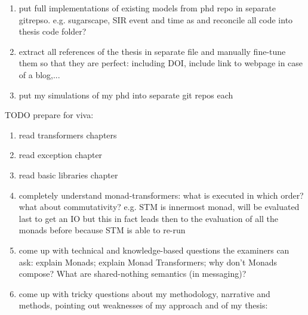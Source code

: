 \documentclass[oneside]{book}
\begin{document}
\begin{enumerate}
	\item put full implementations of existing models from phd repo in separate gitrepso. e.g. sugarscape, SIR event and time as and reconcile all code into thesis code folder?
	
	\item extract all references of the thesis in separate file and manually fine-tune them so that they are perfect: including DOI, include link to webpage in case of a blog,...
	
	\item put my simulations of my phd into separate git repos each
\end{enumerate}

TODO prepare for viva:
\begin{enumerate}
	\item read transformers chapters
	
	\item read exception chapter

	\item read basic libraries chapter	
	
	\item completely understand monad-transformers: what is executed in which order? what about commutativity? e.g. STM is innermost monad, will be evaluated last to get an IO but this in fact leads then to the evaluation of all the monads before because STM is able to re-run
	
	\item come up with technical and knowledge-based questions the examiners can ask: explain Monads; explain Monad Transformers; why don't Monads compose? What are shared-nothing semantics (in messaging)? 
	
	\item come up with tricky questions about my methodology, narrative and methods, pointing out weaknesses of my approach and of my thesis:
\end{enumerate}

\end{document}
